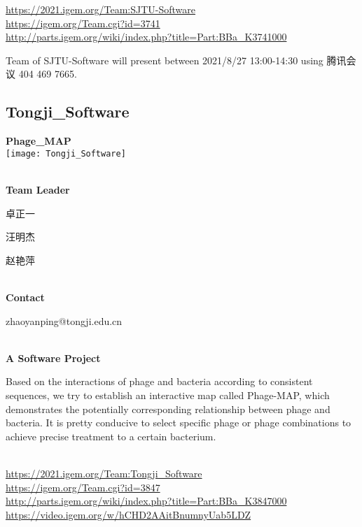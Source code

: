 \url{https://2021.igem.org/Team:SJTU-Software }\\
\url{https://igem.org/Team.cgi?id=3741 }\\
\url{http://parts.igem.org/wiki/index.php?title=Part:BBa_K3741000 }\\


\vfill{}









Team of SJTU-Software will present between 2021/8/27 13:00-14:30        using 腾讯会议 404 469 7665.
\newpage


\subsection{\textcolor{Blu}{ Tongji\_Software } }
\vspace{5mm}
\begin{center}
\large{
  \textbf{ Phage_MAP }\\

  \texttt{[image: Tongji\_Software]}
}
\end{center}
\textbf{\\Team Leader}

  卓正一

  汪明杰

  赵艳萍


\textbf{\\Contact}

  zhaoyanping@tongji.edu.cn


\textbf{\\A Software Project\\}\begin{spacing}{1.5}

Based on the interactions of phage and bacteria according to consistent sequences, we try to establish an interactive map called Phage-MAP, which demonstrates the potentially corresponding relationship between phage and bacteria. It is pretty conducive to select specific phage or phage combinations to achieve precise treatment to a certain bacterium.\end{spacing}
\\

\url{https://2021.igem.org/Team:Tongji\_Software }\\
\url{https://igem.org/Team.cgi?id=3847 }\\
\url{http://parts.igem.org/wiki/index.php?title=Part:BBa_K3847000 }\\
\url{https://video.igem.org/w/hCHD2AAitBnumnyUab5LDZ }\\


